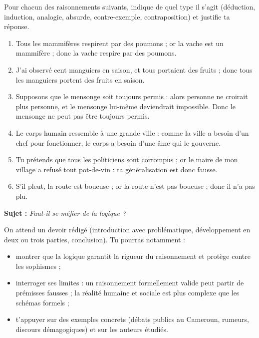 \documentclass[11pt]{article}
\newcounter{popsec}
\newcounter{popsub}
\newcommand{\courssub}[1]{%
  \stepcounter{popsub}%
  \par\vspace{9pt}\noindent{\popxbold\fontsize{11.5}{13}\selectfont\color{popink}{\color{poporange}\thepopsec.\thepopsub}\hspace{6pt}#1}\par\nopagebreak\vspace{4pt}
}
\begin{document}
\begin{exercice}
Pour chacun des raisonnements suivants, indique de quel type il s'agit (déduction, induction, analogie, absurde, contre-exemple, contraposition) et justifie ta réponse.

\begin{enumerate}
\item \guillemotleft Tous les mammifères respirent par des poumons ; or la vache est un mammifère ; donc la vache respire par des poumons. \guillemotright
\item \guillemotleft J'ai observé cent manguiers en saison, et tous portaient des fruits ; donc tous les manguiers portent des fruits en saison. \guillemotright
\item \guillemotleft Supposons que le mensonge soit toujours permis : alors personne ne croirait plus personne, et le mensonge lui-même deviendrait impossible. Donc le mensonge ne peut pas être toujours permis. \guillemotright
\item \guillemotleft Le corps humain ressemble à une grande ville : comme la ville a besoin d'un chef pour fonctionner, le corps a besoin d'une âme qui le gouverne. \guillemotright
\item \guillemotleft Tu prétends que tous les politiciens sont corrompus ; or le maire de mon village a refusé tout pot-de-vin : ta généralisation est donc fausse. \guillemotright
\item \guillemotleft S'il pleut, la route est boueuse ; or la route n'est pas boueuse ; donc il n'a pas plu. \guillemotright
\end{enumerate}
\end{exercice}

\courssub{Je me prépare au Bac}

\begin{exercice}
\textbf{Sujet :} \emph{Faut-il se méfier de la logique ?}

On attend un devoir rédigé (introduction avec problématique, développement en deux ou trois parties, conclusion). Tu pourras notamment :
\begin{itemize}
\item montrer que la logique garantit la rigueur du raisonnement et protège contre les sophismes ;
\item interroger ses limites : un raisonnement formellement valide peut partir de prémisses fausses ; la réalité humaine et sociale est plus complexe que les schémas formels ;
\item t'appuyer sur des exemples concrets (débats publics au Cameroun, rumeurs, discours démagogiques) et sur les auteurs étudiés.
\end{itemize}
\end{exercice}
\end{document}
